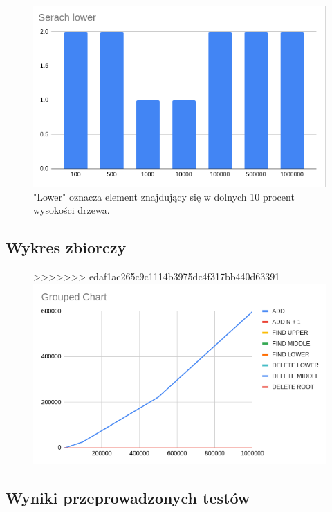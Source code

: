 \documentclass{article}
\begin{document}
\begin{figure}[H]
    \centering
    \includegraphics[width=\textwidth]{"../assets/4_5.png"}
    \caption{"Lower" oznacza element znajdujący się w dolnych 10 procent wysokości drzewa.}
    \label{fig:4_5}

\end{figure}

\subsection*{Wykres zbiorczy}

\begin{figure}[H]
    \centering
>>>>>>> edaf1ac265c9c1114b3975dc4f317bb440d63391
    \includegraphics[width=\textwidth]{"../assets/4_9.png"}    
    \label{fig:4_9}

\end{figure}

\subsection*{Wyniki przeprowadzonych testów}
\end{document}

